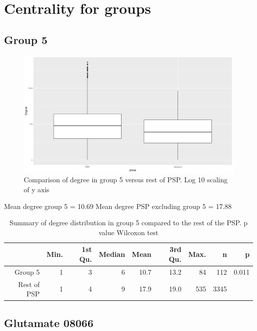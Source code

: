 \section{Centrality for groups}

\subsection{Group 5}
\begin{figure}
    \centering
    \includegraphics[width=\textwidth]{images/Rplot_boxplot_group5_degree_PSP.png}
    \caption{Comparison of degree in group 5 versus rest of PSP. Log 10 scaling of y axis}
    \label{fig:group 5 degree compared with rest of PSP}
\end{figure}

Mean degree group 5 = 10.69
Mean degree PSP excluding group 5 = 17.88

\begin{table}[ht]
\centering
\begin{tabular}{rrrrrrrrr}
  \hline
 & Min. & 1st Qu. & Median & Mean & 3rd Qu. & Max. & n & p \\ 
  \hline
Group 5 & 1 & 3 & 6 & 10.7 & 13.2 & 84 & 112 & 0.011 \\ 
Rest of PSP   & 1 & 4 & 9 & 17.9 & 19.0 & 535 & 3345 &  \\ 
     \hline
\end{tabular}
\caption{Summary of degree distribution in group 5 compared to the rest of the PSP. p value Wilcoxon test} 
\label{tab:Summary of degree distribution in group 5 compared to the rest of the PSP. p value Wilcoxon test for difference in mean}
\end{table}

\subsection{Glutamate 08066}

